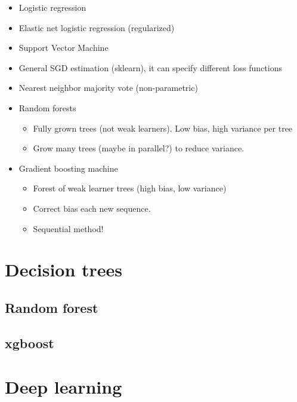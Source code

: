 \documentclass[fontset=fandol,zihao=false,scheme=chinese,heading=true,UTF8]{ctexbook}
\providecommand{\tightlist}{%
  \setlength{\itemsep}{0pt}\setlength{\parskip}{0pt}}
\begin{document}
\begin{itemize}
\tightlist
\item
  Logistic regression
\item
  Elastic net logistic regression (regularized)
\item
  Support Vector Machine
\item
  General SGD estimation (sklearn), it can specify different loss functions
\item
  Nearest neighbor majority vote (non-parametric)
\item
  Random forests

  \begin{itemize}
  \tightlist
  \item
    Fully grown trees (not weak learners). Low bias, high variance per tree
  \item
    Grow many trees (maybe in parallel?) to reduce variance.
  \end{itemize}
\item
  Gradient boosting machine

  \begin{itemize}
  \tightlist
  \item
    Forest of weak learner trees (high bias, low variance)
  \item
    Correct bias each new sequence.
  \item
    Sequential method!
  \end{itemize}
\end{itemize}

\hypertarget{decision-trees}{%
\chapter{Decision trees}\label{decision-trees}}

\hypertarget{random-forest}{%
\section{Random forest}\label{random-forest}}

\hypertarget{xgboost}{%
\section{xgboost}\label{xgboost}}

\hypertarget{deep-learning}{%
\chapter{Deep learning}\label{deep-learning}}
\end{document}
